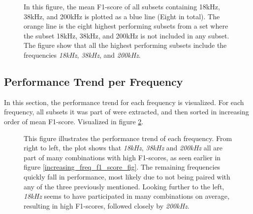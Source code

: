         \begin{figure}[H]
            \centering
            
            \caption[With and without unique subset]{In this figure, the mean F1-score of all subsets containing 18kHz, 38kHz, and 200kHz is plotted as a blue line (Eight in total). The orange line is the eight highest performing subsets from a set where the subset 18kHz, 38kHz, and 200kHz is not included in any subset. The figure show that all the highest performing subsets include the frequencies \textit{18kHz}, \textit{38kHz}, and \textit{200kHz}.}
          	\medskip 
            \label{with_without_figure}
        \end{figure}
        
        
    \subsection{Performance Trend per Frequency}
        In this section, the performance trend for each frequency is visualized. For each frequency, all subsets it was part of were extracted, and then sorted in increasing order of mean F1-score. Visualized in figure \ref{performance_trend_fig}.
        
        \begin{figure}[H]
            \centering
            
            \caption[Performance trend per frequency]{This figure illustrates the performance trend of each frequency. From right to left, the plot shows that \textit{18kHz}, \textit{38kHz} and \textit{200kHz} all are part of many combinations with high F1-scores, as seen earlier in figure \ref{increasing_freq_f1_score_fig}. The remaining frequencies quickly fall in performance, most likely due to not being paired with any of the three previously mentioned. Looking further to the left, \textit{18kHz} seems to have participated in many combinations on average, resulting in high F1-scores, followed closely by \textit{200kHz}.}
          	\medskip 
            \label{performance_trend_fig}
        \end{figure}
        

